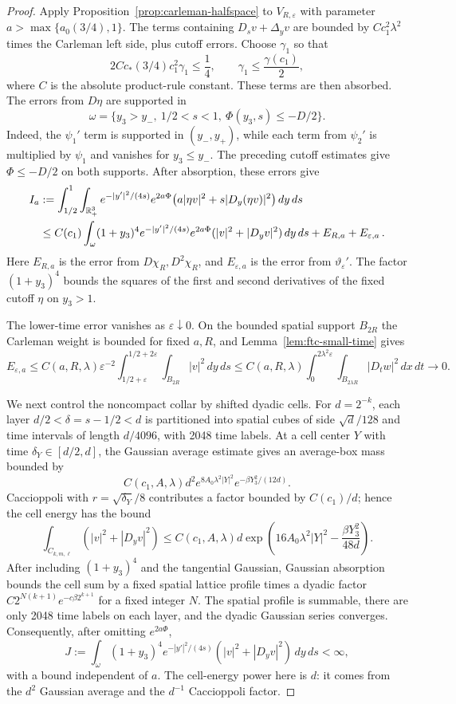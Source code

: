 \documentclass[11pt,letterpaper]{article}
\numberwithin{equation}{section}
\theoremstyle{plain}
\theoremstyle{definition}
\theoremstyle{remark}
\begin{document}
\begin{proof}
Apply Proposition~\ref{prop:carleman-halfspace} to $V_{R,\varepsilon}$
with parameter $a>\max\{a_0(3/4),1\}$. The terms containing
$D_sv+\Delta_yv$ are bounded by
$C c_1^2\lambda^2$ times the Carleman left side, plus cutoff errors.
Choose $\gamma_1$ so that
\[
  2C c_*(3/4)c_1^2\gamma_1\le\frac14,
  \qquad \gamma_1\le\frac{\gamma(c_1)}2,
\]
where $C$ is the absolute product-rule constant. These terms are then
absorbed. The errors from $D\eta$ are supported in
\[
\omega=\{y_3>y_-,\ 1/2<s<1,\ \Phi(y_3,s)\le-D/2\}.
\]
Indeed, the $\psi_1'$ term is supported in $(y_-,y_+)$, while each term from
$\psi_2'$ is multiplied by $\psi_1$ and vanishes for $y_3\le y_-$. The
preceding cutoff estimates give $\Phi\le-D/2$ on both supports. After
absorption, these errors give
\begin{align}
 I_a&:=\int_{1/2}^1\int_{\mathbb{R}^3_+}e^{-|y'|^2/(4s)}e^{2a\Phi}
       \big(a|\eta v|^2+s|D_y(\eta v)|^2\big)\,dy\,ds \notag\\
 &\le C(c_1)\int_\omega (1+y_3)^4 e^{-|y'|^2/(4s)}e^{2a\Phi}
       (|v|^2+|D_yv|^2)\,dy\,ds+E_{R,a}+E_{\varepsilon,a}\,.
 \label{eq:bu-halfspace-carleman}
\end{align}
Here $E_{R,a}$ is the error from $D\chi_R,D^2\chi_R$, and
$E_{\varepsilon,a}$ is the error from $\vartheta_\varepsilon'$. The factor
$(1+y_3)^4$ bounds the squares of the first and second derivatives of the
fixed cutoff $\eta$ on $y_3>1$.

The lower-time error vanishes as $\varepsilon\downarrow0$. On the bounded
spatial support $B_{2R}$ the Carleman weight is bounded for fixed $a,R$, and
Lemma~\ref{lem:ftc-small-time} gives
\[
 E_{\varepsilon,a}\le C(a,R,\lambda)
 \varepsilon^{-2}\int_{1/2+\varepsilon}^{1/2+2\varepsilon}
       \int_{B_{2R}}|v|^2\,dy\,ds
 \le C(a,R,\lambda)\int_0^{2\lambda^2\varepsilon}
       \int_{B_{2\lambda R}}|D_tw|^2\,dx\,dt\longrightarrow0.
\]

We next control the noncompact collar by shifted dyadic cells. For $d=2^{-k}$, each layer $d/2<\delta=s-1/2<d$ is partitioned into spatial cubes of side $\sqrt d/128$ and time intervals of length $d/4096$, with 2048 time labels. At a cell center $Y$ with time $\delta_Y\in[d/2,d]$, the Gaussian average estimate gives an average-box mass bounded by
\[
 C(c_1,A,\lambda)d^2
   e^{8A_0\lambda^2|Y|^2}e^{-\beta Y_3^2/(12d)}.
\]
Caccioppoli with $r=\sqrt{\delta_Y}/8$ contributes a factor bounded by $C(c_1)/d$; hence the cell energy has the bound
\[
 \int_{C_{k,m,\ell}}(|v|^2+|D_yv|^2)
 \leq C(c_1,A,\lambda)d
       \exp\!\left(16A_0\lambda^2|Y|^2
                    -\frac{\beta Y_3^2}{48d}\right).
\]
After including $(1+y_3)^4$ and the tangential Gaussian, Gaussian absorption bounds the cell sum by a fixed spatial lattice profile times a dyadic factor $C2^{N(k+1)}e^{-c\beta 2^{k+1}}$ for a fixed integer $N$. The spatial profile is summable, there are only 2048 time labels on each layer, and the dyadic Gaussian series converges. Consequently, after omitting $e^{2a\Phi}$,
\[
 J:=\int_\omega (1+y_3)^4e^{-|y'|^2/(4s)}
       (|v|^2+|D_yv|^2)\,dy\,ds<\infty,
\]
with a bound independent of $a$. The cell-energy power here is $d$: it comes from the $d^2$ Gaussian average and the $d^{-1}$ Caccioppoli factor.


\end{proof}
\end{document}
